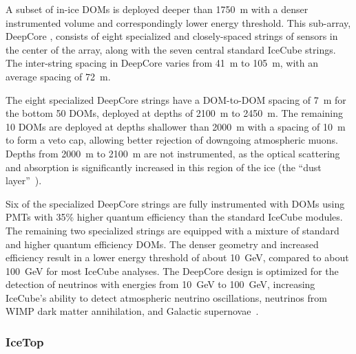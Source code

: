 A subset of in-ice DOMs is deployed deeper than \SI{1750}{\meter} with a denser instrumented volume and
correspondingly lower energy threshold. This
sub-array, DeepCore \cite{ICECUBE:DC}, consists of eight specialized and
closely-spaced strings of sensors in the center of the array, along with
the seven central standard IceCube strings. The inter-string spacing
in DeepCore varies from \SI{41}{\meter} to \SI{105}{\meter}, with an
average spacing of \SI{72}{\meter}.

The eight specialized DeepCore strings have a DOM-to-DOM spacing of
\SI{7}{\meter} for the bottom 50 DOMs, deployed at depths of
\SI{2100}{\meter} to \SI{2450}{\meter}.  The remaining 10 DOMs are
deployed at depths shallower than \SI{2000}{\meter} with a spacing of
\SI{10}{\meter} to form a veto cap, allowing better rejection of downgoing
atmospheric muons.  Depths from \SI{2000}{\meter} to \SI{2100}{\meter}
are not instrumented, as the optical scattering and absorption is
significantly increased in this region of the ice (the ``dust layer''~\cite{Aartsen:2013rt}).

Six of the specialized DeepCore strings are fully instrumented with
DOMs using PMTs with 35\% higher quantum efficiency than the
standard IceCube modules. The remaining two specialized strings are
equipped with a mixture of standard and higher quantum efficiency DOMs. The denser geometry and increased efficiency
result in a lower energy threshold of about
\SI{10}{\giga\electronvolt}, compared to about
\SI{100}{\giga\electronvolt} for most IceCube analyses. The DeepCore design
is optimized for the detection of neutrinos with energies
from \SI{10}{\giga\electronvolt} to \SI{100}{\giga\electronvolt},
increasing IceCube's ability to detect atmospheric neutrino
oscillations, neutrinos from WIMP dark matter annihilation, and Galactic
supernovae~\cite{ICECUBE:DC}. 

\subsubsection{IceTop}

